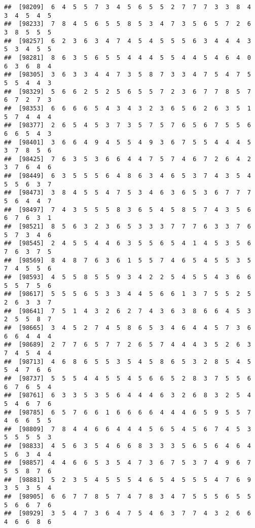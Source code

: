 \documentclass[
]{book}
\begin{document}
\begin{verbatim}
##  [98209]  6  4  5  5  7  3  4  5  6  5  5  2  7  7  7  3  3  8  4  3  4  5  4  5
##  [98233]  7  8  4  5  6  5  5  8  5  3  4  7  3  5  6  5  7  2  6  3  8  5  5  5
##  [98257]  6  2  3  6  3  4  7  4  5  4  5  5  5  6  3  4  4  4  3  5  3  4  5  5
##  [98281]  8  6  3  5  6  5  5  4  4  4  5  5  4  4  5  4  6  4  0  6  3  6  8  4
##  [98305]  3  6  3  3  4  4  7  3  5  8  7  3  3  4  7  5  4  7  5  5  5  4  4  3
##  [98329]  5  6  6  2  5  2  5  6  5  5  7  2  3  6  7  7  8  5  7  6  7  2  7  3
##  [98353]  6  6  6  6  5  4  3  4  3  2  3  6  5  6  2  6  3  5  1  5  7  4  4  4
##  [98377]  2  6  5  4  5  3  7  3  5  7  5  7  6  5  6  7  5  5  6  6  6  5  4  3
##  [98401]  3  6  6  4  9  4  5  5  4  9  3  6  7  5  5  4  4  4  5  3  7  8  5  6
##  [98425]  7  6  3  5  3  6  6  4  4  7  5  7  4  6  7  2  6  4  2  3  7  6  4  6
##  [98449]  6  3  5  5  5  6  4  8  6  3  4  6  5  3  7  4  3  5  4  5  5  6  3  7
##  [98473]  3  8  4  5  5  4  7  5  3  4  6  3  6  5  3  6  7  7  7  5  6  4  4  7
##  [98497]  7  4  3  5  5  5  8  3  6  5  4  5  8  5  7  4  3  5  6  6  7  6  3  1
##  [98521]  8  5  6  3  2  3  6  5  3  3  3  7  7  7  6  3  3  7  6  5  7  3  4  6
##  [98545]  2  4  5  5  4  4  6  3  5  5  6  5  4  1  4  5  3  5  6  7  6  3  7  5
##  [98569]  8  4  8  7  6  3  6  1  5  5  7  4  6  5  4  5  5  3  5  7  4  5  5  6
##  [98593]  4  5  5  8  5  5  9  3  4  2  2  5  4  5  5  4  3  6  6  5  5  7  5  6
##  [98617]  5  5  5  6  5  3  3  4  4  5  6  6  1  3  7  5  5  2  5  2  6  3  3  7
##  [98641]  7  5  1  4  3  2  6  2  7  4  3  6  3  8  6  6  4  5  3  2  5  5  8  7
##  [98665]  3  4  5  2  7  4  5  8  6  5  3  4  6  4  4  5  7  3  6  6  6  4  4  4
##  [98689]  2  7  7  6  5  7  7  2  6  5  7  4  4  4  3  5  2  6  3  7  4  5  4  4
##  [98713]  4  6  8  6  5  5  3  5  4  5  8  6  5  3  2  8  5  4  5  5  4  7  6  6
##  [98737]  5  5  5  4  4  5  5  4  5  6  6  5  2  8  3  7  5  5  6  6  7  6  5  4
##  [98761]  6  3  3  5  3  5  6  4  4  4  6  3  2  6  8  3  2  5  4  5  4  6  7  6
##  [98785]  6  5  7  6  6  1  6  6  6  6  4  4  4  6  5  9  5  5  7  4  6  6  5  5
##  [98809]  7  8  4  4  6  6  4  4  4  5  6  5  4  5  6  7  4  5  3  5  5  5  5  3
##  [98833]  4  5  6  3  5  4  6  6  8  3  3  3  5  6  5  6  4  6  4  5  6  3  4  4
##  [98857]  4  4  6  6  5  3  5  4  7  3  6  7  5  3  7  4  9  6  7  5  5  8  7  6
##  [98881]  5  2  3  5  4  5  5  5  4  6  5  4  5  5  5  4  7  6  9  3  5  3  5  4
##  [98905]  6  6  7  7  8  5  7  4  7  8  3  4  7  5  5  5  6  5  5  5  6  6  7  6
##  [98929]  3  5  4  7  3  6  4  7  5  4  6  3  7  7  4  3  2  6  6  4  6  6  8  6

\end{verbatim}
\end{document}
